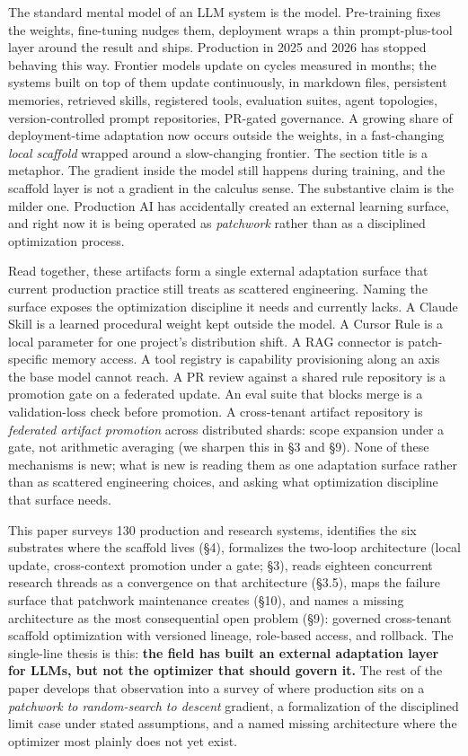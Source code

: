 \documentclass[
]{article}
\begin{document}
The standard mental model of an LLM system is the model. Pre-training
fixes the weights, fine-tuning nudges them, deployment wraps a thin
prompt-plus-tool layer around the result and ships. Production in 2025
and 2026 has stopped behaving this way. Frontier models update on cycles
measured in months; the systems built on top of them update
continuously, in markdown files, persistent memories, retrieved skills,
registered tools, evaluation suites, agent topologies,
version-controlled prompt repositories, PR-gated governance. A growing
share of deployment-time adaptation now occurs outside the weights, in a
fast-changing \emph{local scaffold} wrapped around a slow-changing
frontier. The section title is a metaphor. The gradient inside the model
still happens during training, and the scaffold layer is not a gradient
in the calculus sense. The substantive claim is the milder one.
Production AI has accidentally created an external learning surface, and
right now it is being operated as \emph{patchwork} rather than as a
disciplined optimization process.

Read together, these artifacts form a single external adaptation surface
that current production practice still treats as scattered engineering.
Naming the surface exposes the optimization discipline it needs and
currently lacks. A Claude Skill is a learned procedural weight kept
outside the model. A Cursor Rule is a local parameter for one project's
distribution shift. A RAG connector is patch-specific memory access. A
tool registry is capability provisioning along an axis the base model
cannot reach. A PR review against a shared rule repository is a
promotion gate on a federated update. An eval suite that blocks merge is
a validation-loss check before promotion. A cross-tenant artifact
repository is \emph{federated artifact promotion} across distributed
shards: scope expansion under a gate, not arithmetic averaging (we
sharpen this in §3 and §9). None of these mechanisms is new; what is new
is reading them as one adaptation surface rather than as scattered
engineering choices, and asking what optimization discipline that
surface needs.

This paper surveys 130 production and research systems, identifies the
six substrates where the scaffold lives (§4), formalizes the two-loop
architecture (local update, cross-context promotion under a gate; §3),
reads eighteen concurrent research threads as a convergence on that
architecture (§3.5), maps the failure surface that patchwork maintenance
creates (§10), and names a missing architecture as the most
consequential open problem (§9): governed cross-tenant scaffold
optimization with versioned lineage, role-based access, and rollback.
The single-line thesis is this: \textbf{the field has built an external
adaptation layer for LLMs, but not the optimizer that should govern it.}
The rest of the paper develops that observation into a survey of where
production sits on a \emph{patchwork to random-search to descent}
gradient, a formalization of the disciplined limit case under stated
assumptions, and a named missing architecture where the optimizer most
plainly does not yet exist.
\end{document}
